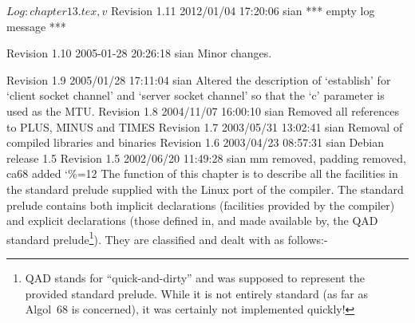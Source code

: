  $Log: chapter13.tex,v $
 Revision 1.11  2012/01/04 17:20:06  sian
 *** empty log message ***

 Revision 1.10  2005-01-28 20:26:18  sian
 Minor changes.

 Revision 1.9  2005/01/28 17:11:04  sian
 Altered the description of `establish' for `client socket channel' and
 `server socket channel' so that the `c' parameter is used as the MTU.
%
 Revision 1.8  2004/11/07 16:00:10  sian
 Removed all references to PLUS, MINUS and TIMES
%
 Revision 1.7  2003/05/31 13:02:41  sian
 Removal of compiled libraries and binaries
%
 Revision 1.6  2003/04/23 08:57:31  sian
 Debian release 1.5
%
 Revision 1.5  2002/06/20 11:49:28  sian
 mm removed, padding removed, ca68 added
%
\catcode`\%=12
The function of this chapter is to describe all the facilities in the
standard prelude supplied with the Linux port of the
compiler. The standard prelude contains both implicit declarations
(facilities provided by the compiler) and explicit declarations
(those defined in, and made available by, the QAD standard
prelude\footnote{QAD stands for ``quick-and-dirty'' and was supposed
to represent the provided standard prelude. While it is not entirely
standard (as far as Algol~68 is concerned), it was certainly not
implemented quickly!}). They are classified and dealt with as follows:-
